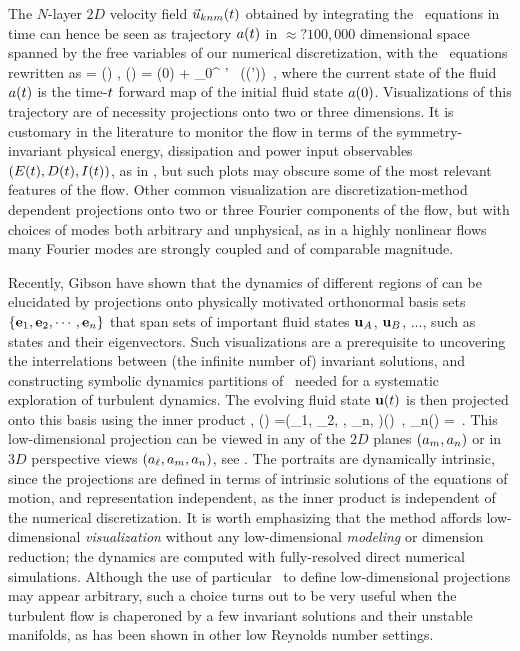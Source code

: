 The $N$-layer $2D$ velocity field $\vec{u}_{knm}(t)$ obtained by
integrating the \NS\ equations in time can hence be seen as trajectory
$a(t)$ in $\approx ?100,000$ dimensional space spanned by the free
variables of our numerical discretization, with the \NS\ equations
 rewritten as
\beq
   \dot{\ssp} = \vel(\ssp) ,
   \qquad
   \ssp(\zeit) = \ssp(0)
            + \int_0^\zeit \! \zeit' \, \vel(\ssp(\zeit'))
\,,
where the current state of the fluid $ a(t)$ is the time-$t$
forward map of the initial fluid state  $a(0)$. Visualizations
of this trajectory are of necessity projections onto two or three
dimensions. It is customary in the literature to monitor the flow in
terms of the symmetry-invariant physical energy, dissipation and power
input observables $(E(t),D(t),I(t))$,
as in , but such plots may obscure
some of the most relevant features of the flow. Other common
visualization are discretization-method dependent projections onto
two or three Fourier components of the flow, but with choices of modes both
arbitrary and unphysical, as in a highly nonlinear flows many Fourier
modes are strongly coupled and of comparable magnitude.

Recently, Gibson \etal{} have shown that the dynamics of
different regions of {\statesp} can be elucidated by projections onto
physically motivated orthonormal basis sets $\{{\bf e}_1, {\bf e}_2, \cdots,
{\bf e}_n\}$ that span sets of important fluid states ${\bf u}_A$, ${\bf u}_B$,
$\dots$, such as {\eqv} states and their eigenvectors. Such
visualizations are a prerequisite to uncovering the interrelations
between (the infinite number of) invariant solutions, and constructing
symbolic dynamics partitions of \statesp\ needed for a systematic
exploration of turbulent dynamics. The evolving fluid state ${\bf u}(t)$
is then projected onto this basis using the
inner product ,
\beq
\ssp(\zeit) =(\ssp_1, \ssp_2, \cdots, \ssp_n, \cdots)(\zeit)
    \,,\qquad
\ssp_n(\zeit) = 
\,.
This low-dimensional projection can be viewed in any of the $2D$ planes
$(a_m, a_n)$ or in $3D$ perspective views $(a_{\ell},a_m,
a_n)$, see . The {\stateDsp} portraits are
{dynamically intrinsic}, since the projections are defined in terms of
intrinsic solutions of the equations of motion, and {representation
independent}, as the inner product  is independent of
the numerical discretization. It is worth emphasizing that the method
affords low-dimensional {\em visualization} without any low-dimensional
{\em modeling} or dimension reduction; the dynamics are computed with
fully-resolved direct numerical simulations. Although the use of
particular \reqva\ to define low-dimensional projections may appear
arbitrary, such a choice turns out to be very useful when the turbulent
flow is chaperoned by a few invariant solutions and their unstable
manifolds, as has been shown in other low Reynolds number
settings.



